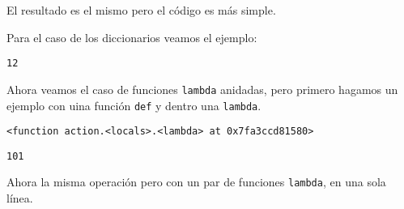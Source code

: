 El resultado es el mismo pero el código es más simple.

Para el caso de los diccionarios veamos el ejemplo:

\begin{Shaded}
\begin{Highlighting}[]
\OperatorTok{=} 
\OperatorTok{=}\NormalTok{ \{}
    \NormalTok{: }\OperatorTok{+}\NormalTok{, }
    \NormalTok{: }\OperatorTok{*}\NormalTok{,}
    \NormalTok{ : }\OperatorTok{**}
\NormalTok{\}}

\NormalTok{)}
\end{Highlighting}
\end{Shaded}

\begin{verbatim}
12
\end{verbatim}

Ahora veamos el caso de funciones \texttt{lambda} anidadas, pero primero
hagamos un ejemplo con uina función \texttt{def} y dentro una
\texttt{lambda}.

\begin{Shaded}
\begin{Highlighting}[]
     \OperatorTok{+}

\OperatorTok{=}\NormalTok{)}
\NormalTok{)}
\end{Highlighting}
\end{Shaded}

\begin{verbatim}
<function action.<locals>.<lambda> at 0x7fa3ccd81580>
\end{verbatim}

\begin{verbatim}
101
\end{verbatim}

Ahora la misma operación pero con un par de funciones \texttt{lambda},
en una sola línea.

\begin{Shaded}
\begin{Highlighting}[]
\OperatorTok{=} \OperatorTok{+}
\OperatorTok{=}\NormalTok{)}
\NormalTok{)}
\end{Highlighting}
\end{Shaded}

